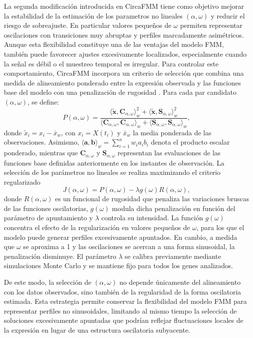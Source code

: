 \documentclass[12pt, a4paper]{report}
\begin{document}
La segunda modificación introducida en CircaFMM tiene como objetivo mejorar la estabilidad de la estimación de los parametros no lineales \((\alpha,\omega)\) y reducir el riesgo de sobreajuste. En particular valores pequeños de \(\omega\)
permiten representar oscilaciones con transiciones muy abruptas y perfiles marcadamente asimétricos. Aunque esta flexibilidad constituye una de las ventajas del modelo FMM, también puede favorecer ajustes excesivamente localizados, especialmente 
cuando la señal es débil o el muestreo temporal es irregular. Para controlar este comportamiento, CircaFMM incorpora un criterio de selección que combina una medida de alineamiento ponderado entre la expresión observada y las funciones base del modelo con una penalización de 
rugosidad . Para cada par candidato \((\alpha,\omega)\), se define:
\[P(\alpha,\omega)=\frac{\langle\widetilde{\mathbf{x}},\mathbf C_{\alpha,\omega}\rangle_w^2+\langle\widetilde{\mathbf{x}},\mathbf S_{\alpha,\omega}\rangle_w^2}{\langle\mathbf C_{\alpha,\omega},\mathbf C_{\alpha,\omega}\rangle_w+\langle\mathbf S_{\alpha,\omega},\mathbf S_{\alpha,\omega}\rangle_w},\]
donde \(\widetilde{x}_i=x_i-\bar{x}_w\), con \(x_i=X(t_i)\) y \(\bar{x}_w\) la media ponderada de las observaciones. Asimismo, \(\langle\mathbf a,\mathbf b\rangle_w=\sum_{i=1}^{n}w_i a_i b_i\) denota el producto escalar ponderado, mientras que \(\mathbf C_{\alpha,\omega}\) y \(\mathbf S_{\alpha,\omega}\) representan las evaluaciones de las funciones base definidas anteriormente en los instantes de observación. La selección de los parámetros no lineales se realiza maximizando el criterio regularizado
\[J(\alpha,\omega)=P(\alpha,\omega)-\lambda g(\omega)R(\alpha,\omega),\]
donde \(R(\alpha,\omega)\) es un funcional de rugosidad que penaliza las variaciones bruscas de las funciones oscilatorias, \(g(\omega)\) modula dicha penalización en función del parámetro de apuntamiento y \(\lambda\) controla su intensidad. La función \(g(\omega)\) concentra el efecto de la regularización en valores pequeños de \(\omega\), para los que el modelo puede generar perfiles excesivamente apuntados. En cambio, a medida que \(\omega\) se aproxima a 1 y las oscilaciones se acercan a una forma sinusoidal, la penalización disminuye. El parámetro \(\lambda\) se calibra previamente mediante simulaciones Monte Carlo y se mantiene fijo para todos los genes analizados. 

De este modo, la selección de \((\alpha,\omega)\) no depende únicamente del alineamiento con los datos observados, sino también de la regularidad de la forma oscilatoria estimada. Esta estrategia permite conservar la flexibilidad del modelo FMM para representar perfiles no sinusoidales, limitando al mismo tiempo la selección de soluciones excesivamente apuntadas que podrían reflejar fluctuaciones locales de la expresión en lugar de una estructura oscilatoria subyacente. 
\end{document}

